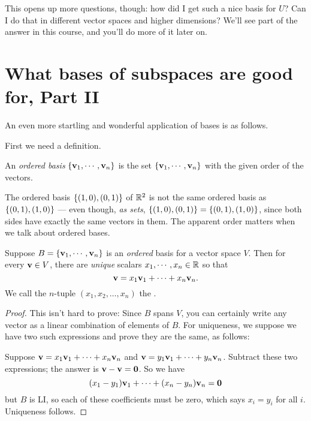 This opens up more questions, though:  how did I get such a nice
basis for $U$?  Can I do that in different vector spaces and
higher dimensions?  We'll see part of the answer in this course,
and you'll do more of it later on.


\section{What bases of subspaces are good for, Part II}

An even more startling and wonderful application of bases is
as follows. 

First we need a definition.

\begin{definition} An {\it ordered basis} $\{\mathbf{v}_1,\cdots, \mathbf{v}_n \}$ is the set $\{\mathbf{v}_1,\cdots, \mathbf{v}_n \}$ with the given order of the vectors.

\end{definition}
\begin{myexample} The ordered basis  $\{(1,0), (0,1) \}$ of $\mathbb{R}^2$ is not the same ordered basis as $\{ (0,1), (1,0) \}$ --- even though, {\it as sets}, $\{(1,0), (0,1) \}= \{ (0,1), (1,0) \}$, since both sides have exactly the same vectors in them.  The apparent order matters when we talk about ordered bases.
\end{myexample}

\begin{theorem}[Coordinates]
 

Suppose $B = \{\mathbf{v}_1,\cdots, \mathbf{v}_n\}$ is an {\it ordered }basis for a vector
space $V$.  Then for every $\mathbf{v} \in V$, there are \emph{unique}
scalars $x_1, \cdots, x_n \in \mathbb{R}$ so that 
$$
\mathbf{v} = x_1\mathbf{v}_1 + \cdots + x_n\mathbf{v}_n.
$$
We call the $n$-tuple $(x_1,x_2, \ldots, x_n)$ the .
\end{theorem}

\begin{proof}
This isn't hard to prove:  Since $B$ spans $V$, you can certainly
write any vector as a linear combination of elements of $B$.  For
uniqueness, we suppose we have two such expressions  and prove
they are the same, as follows:

Suppose $\mathbf{v} = x_1\mathbf{v}_1 + \cdots + x_n\mathbf{v}_n$ and $\mathbf{v} = y_1\mathbf{v}_1 + \cdots + y_n\mathbf{v}_n$.  Subtract these two expressions; the answer is $\mathbf{v}-\mathbf{v} = \mathbf{0}$.
So we have
$$
(x_1-y_1)\mathbf{v}_1 + \cdots + (x_n-y_n)\mathbf{v}_n = \mathbf{0}
$$
but $B$ is LI, so each of these coefficients must be zero, which
says $x_i = y_i$ for all $i$.  Uniqueness follows.
\end{proof}

